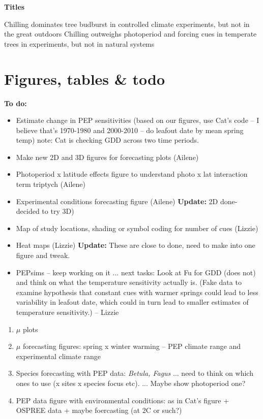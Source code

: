 \documentclass[11pt,letter]{article}
\begin{document}
%
 
\renewcommand{\refname}{\CHead{}}


{\bf Titles}

Chilling dominates tree budburst in controlled climate experiments, but not in the great outdoors
Chilling outweighs photoperiod and forcing cues in temperate trees in experiments, but not in natural systems



\section{Figures, tables \& todo}

{\bf To do:}
\begin{itemize}
\item Estimate change in PEP sensitivities (based on our figures, use Cat's code -- I believe that's 1970-1980 and 2000-2010 -- do leafout date by mean spring temp)
note: Cat is checking GDD across two time periods.
\item Make new 2D and 3D figures for forecasting plots (Ailene)
\item Photoperiod x latitude effects figure to understand photo x lat interaction term  triptych (Ailene)
\item Experimental conditions forecasting figure (Ailene) {\bf Update:}  2D done- decided to try 3D)
\item Map of study locations, shading or symbol coding for number of cues (Lizzie)
\item Heat maps (Lizzie) {\bf Update:} These are close to done, need to make into one figure and tweak. 
\item PEPsims -- keep working on it ... next tasks: Look at Fu for GDD (does not) and think on what the temperature sensitivity actually is. (Fake data to examine hypothesis that constant cues with warmer springs could lead to less variability in leafout date, which could in turn lead to smaller estimates of temperature sensitivity.) -- Lizzie
\end{itemize}





\begin{enumerate}
\item $\mu$ plots
\item  $\mu$ forecasting figures: spring x winter warming -- PEP climate range and experimental climate range
\item Species forecasting with PEP data: \emph{Betula, Fagus} ... need to think on which ones to use (x sites x species focus etc). ... Maybe show photoperiod one?
\item PEP data figure with environmental conditions: as in Cat's figure + OSPREE data + maybe foercasting (at 2C or such?)
\end{enumerate}
\end{document}
